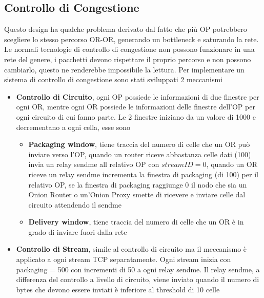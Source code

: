 \subsection{Controllo di Congestione} \label{sec:CongestionControl}
Questo design ha qualche problema derivato dal fatto che più OP potrebbero scegliere lo stesso percorso OR-OR, generando un bottleneck e saturando la rete. 
Le normali tecnologie di controllo di congestione non possono funzionare in una rete del genere, i pacchetti devono rispettare il proprio percorso e non possono cambiarlo, questo ne renderebbe impossibile la lettura. Per implementare un sistema di controllo di congestione sono stati sviluppati 2 meccanismi
\begin{itemize}
    \item \textbf{Controllo di Circuito}, ogni OP possiede le informazioni di due finestre per ogni OR, mentre ogni OR possiede le informazioni delle finestre dell'OP per ogni circuito di cui fanno parte. Le 2 finestre iniziano da un valore di 1000 e decrementano a ogni cella, esse sono
    \begin{itemize}
        \item \textbf{Packaging window}, tiene traccia del numero di celle che un OR può inviare verso l'OP, quando un router riceve abbastanza celle dati (100) invia un relay sendme all relativo OP con $streamID = 0$, quando un OR riceve un relay sendme incrementa la finestra di packaging (di 100) per il relativo OP, se la finestra di packaging raggiunge 0 il nodo che sia un Onion Router o un'Onion Proxy smette di ricevere e inviare celle dal circuito attendendo il sendme
        \item \textbf{Delivery window}, tiene traccia del numero di celle che un OR è in grado di inviare fuori dalla rete
    \end{itemize}
    \item \textbf{Controllo di Stream}, simile al controllo di circuito ma il meccanismo è applicato a ogni stream TCP separatamente. Ogni stream inizia con packaging = 500 con incrementi di 50 a ogni relay sendme. Il relay sendme, a differenza del controllo a livello di circuito, viene inviato quando il numero di bytes che devono essere inviati è inferiore al threshold di 10 celle
\end{itemize}
\cite{onionv2}
